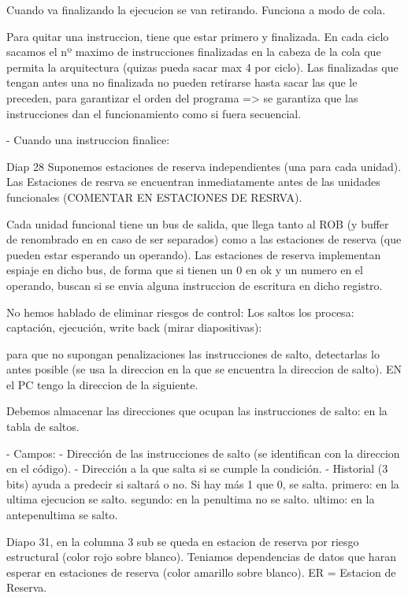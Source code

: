 Cuando va finalizando la ejecucion se van retirando. Funciona a modo de cola.

Para quitar una instruccion, tiene que estar primero y finalizada. 
En cada ciclo sacamos el nº maximo de instrucciones finalizadas en la cabeza de la cola que permita la arquitectura (quizas pueda sacar max 4 por ciclo).
Las finalizadas que tengan antes una no finalizada no pueden retirarse hasta sacar las que le preceden, para garantizar el orden del programa => se garantiza que las instrucciones dan el funcionamiento como si fuera secuencial.

- Cuando una instruccion finalice:


Diap 28
Suponemos estaciones de reserva independientes (una para cada unidad). Las Estaciones de resrva se encuentran inmediatamente antes de las unidades funcionales (COMENTAR EN ESTACIONES DE RESRVA).

Cada unidad funcional tiene un bus de salida, que llega tanto al ROB (y buffer de renombrado en en caso de ser separados) como a las estaciones de reserva (que pueden estar esperando un operando).
Las estaciones de reserva implementan espiaje en dicho bus, de forma que si tienen un 0 en ok y un numero en el operando, buscan si se envia alguna instruccion de escritura en dicho registro.









No hemos hablado de eliminar riesgos de control:
Los saltos los procesa:
captación, ejecución, write back (mirar diapositivas):

para que no supongan penalizaciones las instrucciones de salto, detectarlas lo antes posible (se usa la direccion en la que se encuentra la direccion de salto).
EN el PC tengo la direccion de la siguiente.

Debemos almacenar las direcciones que ocupan las instrucciones de salto: en la tabla de saltos.

- Campos:
- Dirección de las instrucciones de salto (se identifican con la direccion en el código).
- Dirección a la que salta si se cumple la condición.
- Historial (3 bits) ayuda a predecir si saltará o no.
Si hay más 1 que 0, se salta.
primero: en la ultima ejecucion se salto.
segundo: en la penultima no se salto.
ultimo: en  la antepenultima se salto.

Diapo 31, en la columna 3 sub se queda en estacion de reserva por riesgo estructural (color rojo sobre blanco). 
Teniamos dependencias de datos que haran esperar en estaciones de reserva (color amarillo sobre blanco).
ER = Estacion de Reserva.

